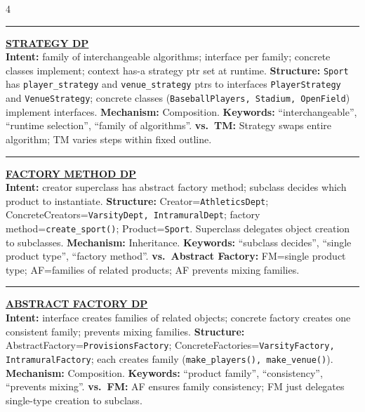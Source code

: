 \documentclass[landscape,letterpaper]{article}
\newcommand{\h}[1]{\textbf{#1}}
\newcommand{\hd}[1]{\vspace{1pt}\noindent\textbf{\underline{#1}}\vspace{-1pt}}
\begin{document}
\begin{multicols}{4}
\vspace{-1pt}\noindent\rule{\columnwidth}{0.2pt}\vspace{-3pt}

\hd{STRATEGY DP}\\[-2pt]
\h{Intent:} family of interchangeable algorithms; interface per family; concrete classes implement; context has-a strategy ptr set at runtime. \h{Structure:} \texttt{Sport} has \texttt{player\_strategy} and \texttt{venue\_strategy} ptrs to interfaces \texttt{PlayerStrategy} and \texttt{VenueStrategy}; concrete classes (\texttt{BaseballPlayers, Stadium, OpenField}) implement interfaces. \h{Mechanism:} Composition. \h{Keywords:} ``interchangeable'', ``runtime selection'', ``family of algorithms''. \h{vs.\ TM:} Strategy swaps entire algorithm; TM varies steps within fixed outline.\\[-2pt]

\vspace{-1pt}\noindent\rule{\columnwidth}{0.2pt}\vspace{-3pt}

\hd{FACTORY METHOD DP}\\[-2pt]
\h{Intent:} creator superclass has abstract factory method; subclass decides which product to instantiate. \h{Structure:} Creator=\texttt{AthleticsDept}; ConcreteCreators=\texttt{VarsityDept, IntramuralDept}; factory method=\texttt{create\_sport()}; Product=\texttt{Sport}. Superclass delegates object creation to subclasses. \h{Mechanism:} Inheritance. \h{Keywords:} ``subclass decides'', ``single product type'', ``factory method''. \h{vs.\ Abstract Factory:} FM=single product type; AF=families of related products; AF prevents mixing families.\\[-2pt]

\vspace{-1pt}\noindent\rule{\columnwidth}{0.2pt}\vspace{-3pt}

\hd{ABSTRACT FACTORY DP}\\[-2pt]
\h{Intent:} interface creates families of related objects; concrete factory creates one consistent family; prevents mixing families. \h{Structure:} AbstractFactory=\texttt{ProvisionsFactory}; ConcreteFactories=\texttt{VarsityFactory, IntramuralFactory}; each creates family (\texttt{make\_players(), make\_venue()}). \h{Mechanism:} Composition. \h{Keywords:} ``product family'', ``consistency'', ``prevents mixing''. \h{vs.\ FM:} AF ensures family consistency; FM just delegates single-type creation to subclass.\\[-2pt]


\end{multicols}
\end{document}
